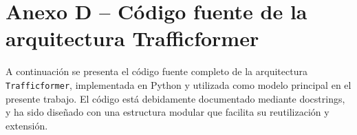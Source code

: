 \section*{Anexo D – Código fuente de la arquitectura Trafficformer}
\label{anexo:codigo_trafficformer}

A continuación se presenta el código fuente completo de la arquitectura \texttt{Trafficformer}, implementada en Python y utilizada como modelo principal en el presente trabajo. El código está debidamente documentado mediante docstrings, y ha sido diseñado con una estructura modular que facilita su reutilización y extensión.

